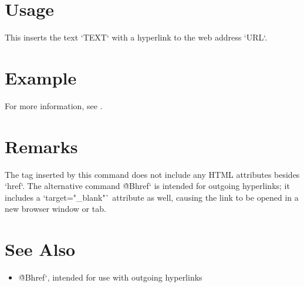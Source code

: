 \section*{Usage}

\begin{texdisp}
\end{texdisp}

This inserts the text \tex`TEXT` with a hyperlink to the web address \tex`URL`.

\section*{Example}

\begin{texdisp}
For more information, see .
\end{texdisp}

\section*{Remarks}

The tag inserted by this command does not include any HTML attributes besides
\tex`href`. The alternative command \`@Bhref` is intended for outgoing
hyperlinks; it includes a \tex`target="_blank"` attribute as well, causing the
link to be opened in a new browser window or tab.

\section*{See Also}

\begin{itemize}
\item \`@Bhref`, intended for use with outgoing hyperlinks
\end{itemize}

